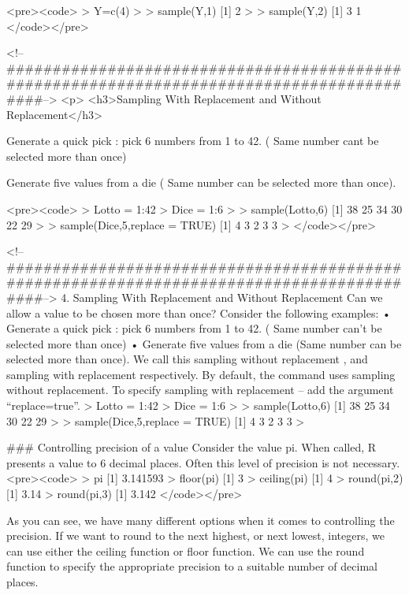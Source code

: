 <pre><code>
> Y=c(4)
>
> sample(Y,1)
[1] 2
> 
> sample(Y,2)
[1] 3 1
</code></pre>

<!--##########################################################################################-->
<p>
<h3>Sampling With Replacement and Without Replacement</h3>

Generate a quick pick : pick 6 numbers from 1 to 42. ( Same number cant be selected more than once)

Generate five values from a die ( Same number can be selected more than once).

<pre><code>
> Lotto = 1:42
> Dice = 1:6
> 
> sample(Lotto,6)
[1] 38 25 34 30 22 29
> 
> sample(Dice,5,replace = TRUE)
[1] 4 3 2 3 3
>
</code></pre>

<!--##########################################################################################-->
4. Sampling With Replacement and Without Replacement
Can we allow a value to be chosen more than once? Consider the following examples:
•	Generate a quick pick : pick 6 numbers from 1 to 42. ( Same number can’t be selected more than once)
•	Generate five values from a die (Same number can be selected more than once).
We call this sampling without replacement , and sampling with replacement respectively.
By default, the command uses sampling without replacement. To specify sampling with replacement – add the argument “replace=true”.
> Lotto = 1:42
> Dice = 1:6
> 
> sample(Lotto,6)
[1] 38 25 34 30 22 29
> 
> sample(Dice,5,replace = TRUE)
[1] 4 3 2 3 3
>



### Controlling precision of a value
Consider the value pi.  When called, R presents a value to 6 decimal places.
Often this level of precision is not necessary.
<pre><code>
> pi
[1] 3.141593
> floor(pi)
[1] 3
> ceiling(pi)
[1] 4
> round(pi,2)
[1] 3.14
> round(pi,3)
[1] 3.142
</code></pre>


As you can see, we have many different options when it comes to controlling the precision. 
If we want to round to the next highest, or next lowest, integers, we can use either the ceiling function or floor function.
We can use the round function to specify the appropriate precision to a suitable number of decimal places.




